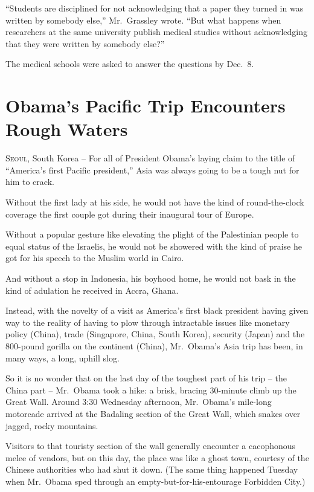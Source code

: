 ﻿\documentclass[12pt]{article}
\begin{document}
``Students are disciplined for not acknowledging that a paper they turned in was written by somebody
else,'' Mr.~Grassley wrote. ``But what happens when researchers at the same university publish
medical studies without acknowledging that they were written by somebody else?''

The medical schools were asked to answer the questions by Dec.~8.

\section{Obama's Pacific Trip Encounters Rough Waters}

\lettrine{S}{eoul}, South Korea -- For all of President Obama's laying claim
to the title of ``America's first Pacific president,'' Asia was always going to be a tough nut for
him to crack.

Without the first lady at his side, he would not have the kind of round-the-clock coverage the first
couple got during their inaugural tour of Europe.

Without a popular gesture like elevating the plight of the Palestinian people to equal status of the
Israelis, he would not be showered with the kind of praise he got for his speech to the Muslim world
in Cairo.

And without a stop in Indonesia, his boyhood home, he would not bask in the kind of adulation he
received in Accra, Ghana.

Instead, with the novelty of a visit as America's first black president having given way to the
reality of having to plow through intractable issues like monetary policy (China), trade (Singapore,
China, South Korea), security (Japan) and the 800-pound gorilla on the continent (China),
Mr.~Obama's Asia trip has been, in many ways, a long, uphill slog.

So it is no wonder that on the last day of the toughest part of his trip -- the China part --
Mr.~Obama took a hike: a brisk, bracing 30-minute climb up the Great Wall. Around 3:30 Wednesday
afternoon, Mr.~Obama's mile-long motorcade arrived at the Badaling section of the Great Wall, which
snakes over jagged, rocky mountains.

Visitors to that touristy section of the wall generally encounter a cacophonous melee of vendors,
but on this day, the place was like a ghost town, courtesy of the Chinese authorities who had shut
it down. (The same thing happened Tuesday when Mr.~Obama sped through an empty-but-for-his-entourage
Forbidden City.)
\end{document}
